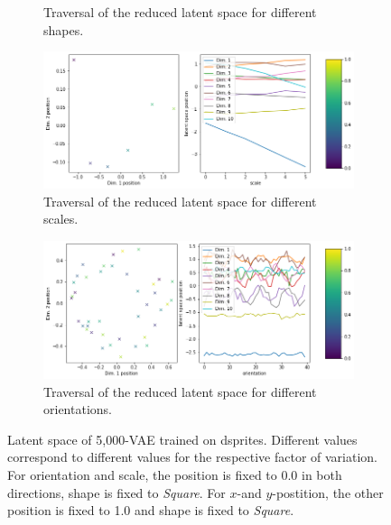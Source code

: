 \begin{figure}[H]
\begin{subfigure}{.48\textwidth}
        \caption{Traversal of the reduced latent space for different shapes.}
    \end{subfigure}
    \begin{subfigure}{.48\textwidth}
        \includegraphics[width=\textwidth]{images/latent_space_traversals/vae_5000_dsprites_latent_space_values_scale.png}
        \caption{Traversal of the reduced latent space for different scales.}
    \end{subfigure}
    \begin{subfigure}{.48\textwidth}
        \includegraphics[width=\textwidth]{images/latent_space_traversals/vae_5000_dsprites_latent_space_values_orientation.png}
        \caption{Traversal of the reduced latent space for different orientations.}
    \end{subfigure}
    \caption[\ac{VAE} on dsprites: Latent Space Values]{Latent space of 5,000-\ac{VAE} trained on dsprites. Different values correspond to different values for the respective factor of variation. For orientation and scale, the position is fixed to 0.0 in both directions, shape is fixed to \textit{Square}. For $x$-and $y$-postition, the other position is fixed to 1.0 and shape is fixed to \textit{Square}.}
    \label{fig:vae_dsprite_5000_latent_space_position}
\end{figure}

